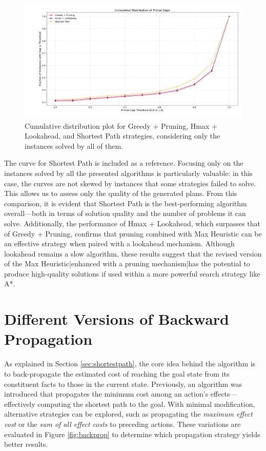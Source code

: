 \begin{figure}[ht]
	\centering
	\includegraphics[width=\textwidth]{images/algs234_solved_all.png}
	\caption{Cumulative distribution plot for Greedy + Pruning, Hmax + Lookahead, and Shortest Path strategies,
		considering only the instances solved by all of them.}
	\label{fig:algs234_solved_all}
\end{figure}

The curve for Shortest Path is included as a reference. Focusing only on the instances solved by all the presented algorithms
is particularly valuable: in this case, the curves are not skewed by instances that some strategies failed to solve.
This allows us to assess only the quality of the generated plans. From this comparison, it is evident that Shortest Path
is the best-performing algorithm overall—both in terms of solution quality and the number of problems it can solve.
Additionally, the performance of Hmax + Lookahead, which surpasses that of Greedy + Pruning, confirms that pruning combined
with Max Heuristic can be an effective strategy when paired with a lookahead mechanism.
Although lookahead remains a slow algorithm, these results suggest that the revised version of the Max Heuristic|enhanced
with a pruning mechanism|has the potential to produce high-quality solutions if used within a more powerful search strategy
like \textsc{A*}.

\section{Different Versions of Backward Propagation}
As explained in Section \ref{sec:shortestpath}, the core idea behind the algorithm is to back-propagate the estimated cost
of reaching the goal state from its constituent facts to those in the current state. Previously, an algorithm was introduced
that propagates the minimum cost among an action's effects—effectively computing the shortest path to the goal.
With minimal modification, alternative strategies can be explored, such as propagating the \textit{maximum effect cost} or the
\textit{sum of all effect costs} to preceding actions. These variations are evaluated in Figure \ref{fig:backprop} to determine which
propagation strategy yields better results.

